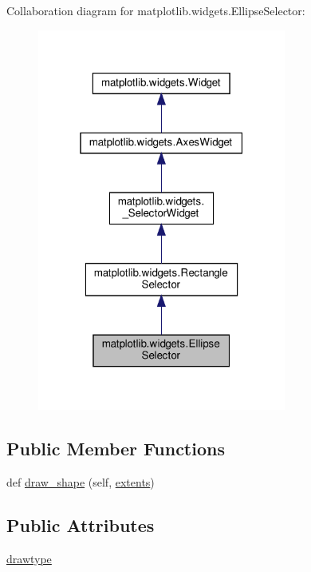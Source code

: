 Collaboration diagram for matplotlib.\+widgets.\+Ellipse\+Selector\+:
\nopagebreak
\begin{figure}[H]
\begin{center}
\leavevmode
\includegraphics[width=232pt]{classmatplotlib_1_1widgets_1_1EllipseSelector__coll__graph}
\end{center}
\end{figure}
\subsection*{Public Member Functions}
\begin{DoxyCompactItemize}
\item 
def \hyperlink{classmatplotlib_1_1widgets_1_1EllipseSelector_ac1b1fad4c46fe7a6172e44312f33fb92}{draw\+\_\+shape} (self, \hyperlink{classmatplotlib_1_1widgets_1_1RectangleSelector_a9ce3b014e6e5ba477b57eeedd6a24e3f}{extents})
\end{DoxyCompactItemize}
\subsection*{Public Attributes}
\begin{DoxyCompactItemize}
\item 
\hyperlink{classmatplotlib_1_1widgets_1_1EllipseSelector_a90f4ef54eb28c8119317a88b532a3393}{drawtype}
\end{DoxyCompactItemize}
